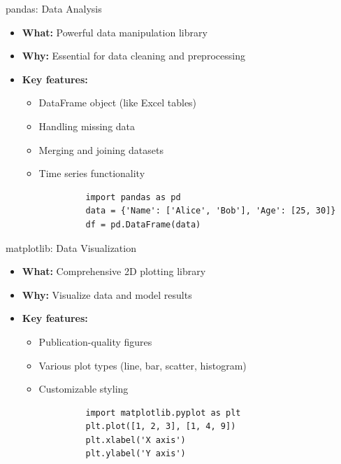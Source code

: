 \documentclass{beamer}
\begin{document}
	\begin{frame}{pandas: Data Analysis}
		\begin{itemize}
			\item \textbf{What:} Powerful data manipulation library
			\item \textbf{Why:} Essential for data cleaning and preprocessing
			\item \textbf{Key features:}
			\begin{itemize}
				\item DataFrame object (like Excel tables)
				\item Handling missing data
				\item Merging and joining datasets
				\item Time series functionality
			\end{itemize}
		\end{itemize}
		
		\begin{example}
			\begin{lstlisting}
				import pandas as pd
				data = {'Name': ['Alice', 'Bob'], 'Age': [25, 30]}
				df = pd.DataFrame(data)
			\end{lstlisting}
		\end{example}
	\end{frame}
	
	\begin{frame}{matplotlib: Data Visualization}
		\begin{itemize}
			\item \textbf{What:} Comprehensive 2D plotting library
			\item \textbf{Why:} Visualize data and model results
			\item \textbf{Key features:}
			\begin{itemize}
				\item Publication-quality figures
				\item Various plot types (line, bar, scatter, histogram)
				\item Customizable styling
			\end{itemize}
		\end{itemize}
		
		\begin{example}
			\begin{lstlisting}
				import matplotlib.pyplot as plt
				plt.plot([1, 2, 3], [1, 4, 9])
				plt.xlabel('X axis')
				plt.ylabel('Y axis')
			\end{lstlisting}
		\end{example}
	\end{frame}
	
\end{document}
